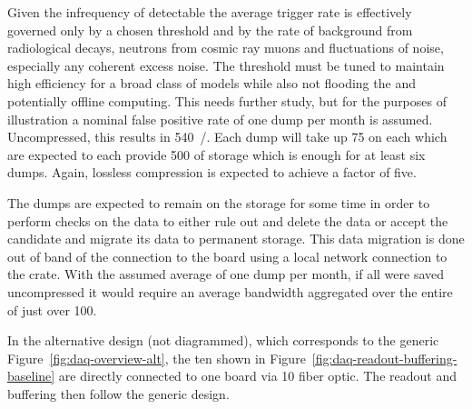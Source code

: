 Given the infrequency of detectable  the average
 trigger rate is effectively governed only by a chosen
threshold and by the rate of background from radiological decays,
neutrons from cosmic ray muons and fluctuations of noise, especially
any coherent excess noise. 
The threshold must be tuned to maintain high efficiency for a broad
class of  models while also not flooding the  and
potentially offline computing. 
This needs further study, but for the purposes of illustration a
nominal false positive rate of one  dump per month is
assumed. 
Uncompressed, this results in \SI{540}{\TB/\year}. 
Each dump will take up \SI{75}{\GB} on each  which are
expected to each provide \SI{500}{\GB} of storage which is enough for
at least six dumps.
Again, lossless compression is expected to achieve a factor of five.

The  dumps are expected to remain on the 
storage for some time in order to perform checks on the data to either
rule out and delete the data or accept the candidate and migrate its
data to permanent storage. 
This data migration is done out of band of the connection to the
 board using a local network connection to the
 crate. 
With the assumed average of one dump per month, if all were saved
uncompressed it would require an average bandwidth aggregated over the
entire  of just over \SI{100}{\Mbps}.

In the alternative   design (not diagrammed), which
corresponds to the generic Figure~\ref{fig:daq-overview-alt}, the ten
 shown in Figure~\ref{fig:daq-readout-buffering-baseline}
are directly connected to one  board via \SI{10}{\Gbps} fiber
optic.  The readout and buffering then follow the generic design.
